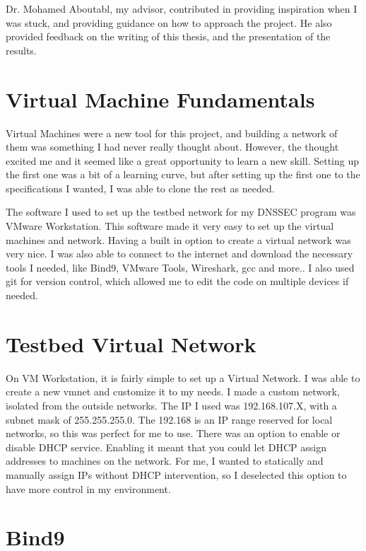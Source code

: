 Dr. Mohamed Aboutabl, my advisor, contributed in providing inspiration when I was stuck, and providing guidance on how to approach the project. He also 
provided feedback on the writing of this thesis, and the presentation of the results.



\section{Virtual Machine Fundamentals}

Virtual Machines were a new tool for this project, and building a network of them was something I had never really thought about. However, the thought excited me 
and it seemed like a great opportunity to learn a new skill. Setting up the first one was a bit of a learning curve, but after setting up the first one to the specifications I wanted,
I was able to clone the rest as needed.

The software I used to set up the testbed network for my DNSSEC program was VMware Workstation. This software made it very easy to set up the virtual machines and network. Having a built in option to create a virtual
network was very nice. I was also able to connect to the internet and download the necessary tools I needed, like Bind9, VMware Tools, Wireshark, gcc and more..
I also used git for version control, which allowed me to edit the code on multiple devices if needed.

\section{Testbed Virtual Network}

On VM Workstation, it is fairly simple to set up a Virtual Network. I was able to create a new vmnet and customize it to my needs. I made a custom network, isolated from the outside networks. The IP I used
was 192.168.107.X, with a subnet mask of 255.255.255.0. The 192.168 is an IP range reserved for local networks, so this was perfect for me to use. There was an option to enable or disable DHCP service. Enabling it meant that you could let DHCP assign 
addresses to machines on the network. For me, I wanted to statically and manually assign IPs without DHCP intervention, so I deselected this option to have more control in my environment.

\section{Bind9}

